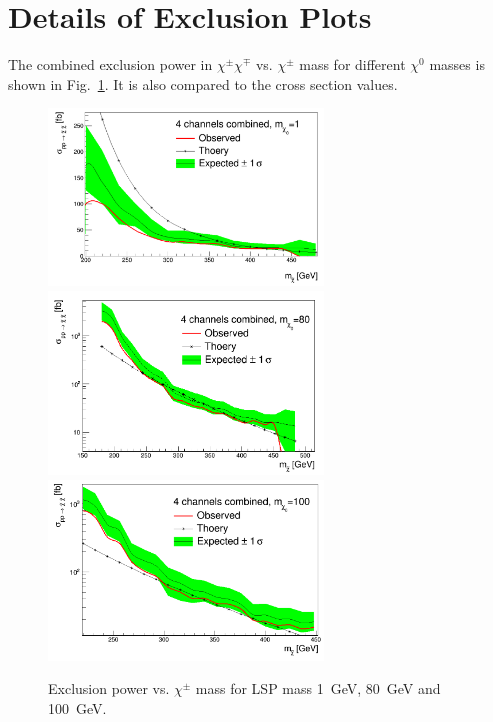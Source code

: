 \section{Details of Exclusion Plots}
The combined exclusion power in $\chi^{\pm}\chi^{\mp}$  vs. $\chi^{\pm}$ mass for different $\chi^{0}$ masses is shown in Fig.~\ref{fig:exclusionpowerchi080100}. It is also compared to the cross section values.
\begin{figure}[!Hhtb]
\centering
\includegraphics[angle=0,width=0.65\textwidth]{Appendix/ChiChiExclusion_mChi1.png} \\
\includegraphics[angle=0,width=0.65\textwidth]{Appendix/ChiChiExclusion_mChi80.png} \\
\includegraphics[angle=0,width=0.65\textwidth]{Appendix/ChiChiExclusion_mChi100.png}
\caption{Exclusion power vs. $\chi^{\pm}$ mass for LSP mass 1~GeV, 80~GeV and 100~GeV. }
\label{fig:exclusionpowerchi080100}
\end{figure}

